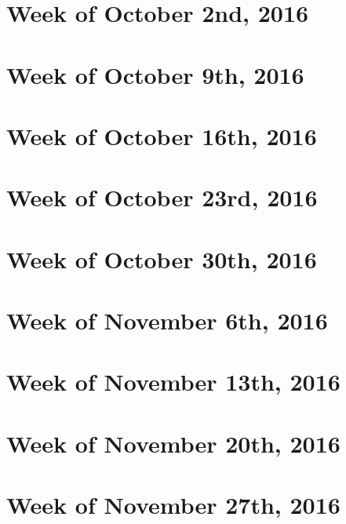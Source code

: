 \documentclass{article}
\begin{document}
\section{Week of October 2nd, 2016}
\section{Week of October 9th, 2016}
\section{Week of October 16th, 2016}
\section{Week of October 23rd, 2016}
\section{Week of October 30th, 2016}
\section{Week of November 6th, 2016}
\section{Week of November 13th, 2016}
\section{Week of November 20th, 2016}
\section{Week of November 27th, 2016}
\end{document}
